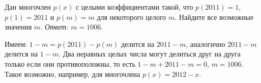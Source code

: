 \problem
Дан многочлен $p(x)$ с целыми коэффициентами такой, что
$p(2011) = 1$, $p(1) = 2011$ и $p(m) = m$ для некоторого целого $m$.
Найдите все возможные значения $m$.
\solution
\emph{Ответ:} $m = 1006$.
\par
Имеем: $1 - m = p(2011) - p(m)$ делится на $2011 - m$, аналогично $2011 - m$
делится на $1 - m$.
Два неравных целых числа могут делиться друг на друга только если они
противоположны, то есть $1 - m + 2011 - m = 0$, $m = 1006$.
Такое возможно, например, для многочлена $p(x) = 2012 - x$.
\endproblem
